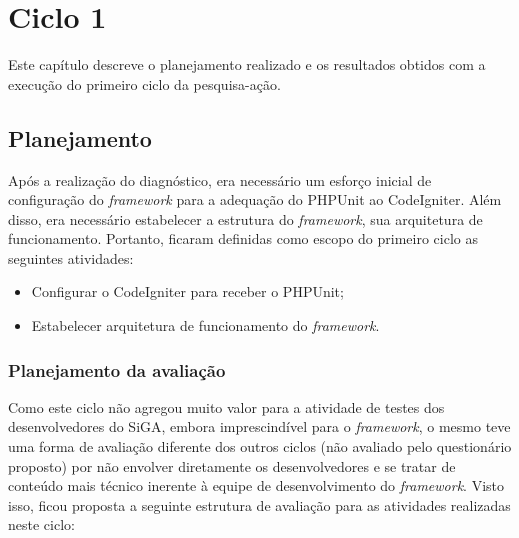 \chapter{Ciclo 1}
  
  Este capítulo descreve o planejamento realizado e os resultados obtidos com a execução do primeiro ciclo da pesquisa-ação.
  
  \section{Planejamento}
  
      Após a realização do diagnóstico, era necessário um esforço inicial de configuração do \textit{framework} para a 
      adequação do PHPUnit ao CodeIgniter. Além disso, era necessário estabelecer a estrutura do \textit{framework},
      sua arquitetura de funcionamento. Portanto, ficaram definidas como escopo do primeiro ciclo as seguintes atividades:
      
      \begin{itemize}
	
	\item Configurar o CodeIgniter para receber o PHPUnit;
	
	\item Estabelecer arquitetura de funcionamento do \textit{framework}.
	
      \end{itemize}
      
      
      \subsection{Planejamento da avaliação}
      
	  Como este ciclo não agregou muito valor para a atividade de testes dos desenvolvedores do SiGA,
	  embora imprescindível para o \textit{framework}, o mesmo teve uma forma de avaliação diferente
	  dos outros ciclos (não avaliado pelo questionário proposto) por não envolver diretamente os desenvolvedores e se
	  tratar de conteúdo mais técnico inerente à equipe de desenvolvimento do \textit{framework}. Visto isso, ficou proposta
	  a seguinte estrutura de avaliação para as atividades realizadas neste ciclo:
	  
